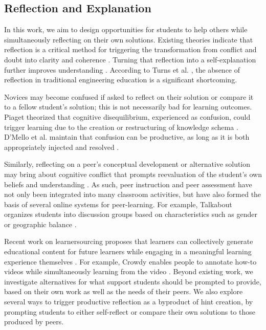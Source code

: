 \subsection{Reflection and Explanation}
In this work, we aim to design opportunities for students to help others while simultaneously reflecting on their own solutions. Existing theories indicate that reflection is a critical method for triggering the transformation from conflict and doubt into clarity and coherence \cite{dewey1933}. Turning that reflection into a self-explanation further improves understanding \cite{selfexplanation}. According to Turns et al. \cite{asee}, the absence of reflection in traditional engineering education is a significant shortcoming. 

Novices may become confused if asked to reflect on their solution or compare it to a fellow student’s solution; this is not necessarily bad for learning outcomes. Piaget theorized that cognitive disequilibrium, experienced as confusion, could trigger learning due to the creation or restructuring of knowledge schema \cite{disequilibrium}. D’Mello et al. maintain that confusion can be productive, as long as it is both appropriately injected and resolved \cite{productiveconfusion}. 

Similarly, reflecting on a peer’s conceptual development or alternative solution may bring about cognitive conflict that prompts reevaluation of the student’s own beliefs and understanding \cite{kavanagh}. As such, peer instruction \cite{mazur} and peer assessment \cite{peerassessment} have not only been integrated into many classroom activities, but have also formed the basis of several online systems for peer-learning. For example, Talkabout organizes students into discussion groups based on characteristics such as gender or geographic balance \cite{talkabout}.

Recent work on learnersourcing proposes that learners can collectively generate educational content for future learners while engaging in a meaningful learning experience themselves \cite{kim2013learnersourcing,weir2015,mitros2015}. For example, Crowdy enables people to annotate how-to videos while simultaneously learning from the video \cite{weir2015}. Beyond existing work, we investigate alternatives for what support students should be prompted to provide, based on their own work as well as the needs of their peers. We also explore several ways to trigger productive reflection as a byproduct of hint creation, by prompting students to either self-reflect or compare their own solutions to those produced by peers. 

